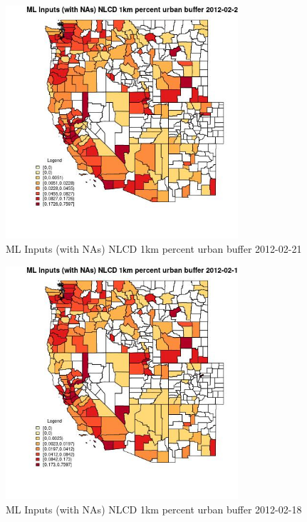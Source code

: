 \begin{figure} 
\centering  
\includegraphics[width=0.77\textwidth]{Code_Outputs/Report_ML_input_PM25_Step4_part_f_de_duplicated_aveswNAs_CountyNLCD_1km_percent_urban_bufferMean2012-02-21.jpg} 
\caption{\label{fig:Report_ML_input_PM25_Step4_part_f_de_duplicated_aveswNAsCountyNLCD_1km_percent_urban_bufferMean2012-02-21}ML Inputs (with NAs) NLCD 1km percent urban buffer 2012-02-21} 
\end{figure} 
 

\begin{figure} 
\centering  
\includegraphics[width=0.77\textwidth]{Code_Outputs/Report_ML_input_PM25_Step4_part_f_de_duplicated_aveswNAs_CountyNLCD_1km_percent_urban_bufferMean2012-02-18.jpg} 
\caption{\label{fig:Report_ML_input_PM25_Step4_part_f_de_duplicated_aveswNAsCountyNLCD_1km_percent_urban_bufferMean2012-02-18}ML Inputs (with NAs) NLCD 1km percent urban buffer 2012-02-18} 
\end{figure} 
 

